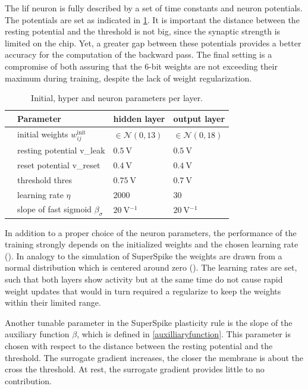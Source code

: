 The \gls{lif} neuron is fully described by a set of time constants and neuron potentials. The potentials are set as indicated in \cref{initparameters}. It is important the distance between the resting potential and the threshold is not big, since the synaptic strength is limited on the chip. Yet, a greater gap between these potentials provides a better accuracy for the computation of the backward pass. The final setting is a compromise of both assuring that the 6-bit weights are not exceeding their maximum during training, despite the lack of weight regularization.

\begin{table}[htb!]\centering{}
	\begin{tabular}{@{}rlll@{}}\toprule
		& Parameter								& 	hidden layer 			& 	output layer \\ \midrule
		& initial weights $w_{ij}^\text{init}$	& 	$\in \mathcal{N}(0,13)$ & 	$\in \mathcal{N}(0,18)$\\
		& resting potential \gls{v_leak}		&	$\SI{0.5}{\V}$ 			& 	$\SI{0.5}{\V}$\\
		& reset potential \gls{v_reset}			&	$\SI{0.4}{\V}$			& 	$\SI{0.4}{\V}$\\
		& threshold \gls{thres} 				&	$\SI{0.75}{\V}$			& 	$\SI{0.7}{\V}$\\
		& learning rate $\eta$ 					&	2000					& 	30			\\
		& slope of fast sigmoid $\beta_\sigma$ 	&	$\SI{20}{\V^{-1}}$		& 	$\SI{20}{\V^{-1}}$	\\
		\bottomrule
	\end{tabular}
	\caption[Initial, hyper and neuron parameters per layer.]{Initial, hyper and neuron parameters per layer.}
	\label{initparameters}
\end{table}

In addition to a proper choice of the neuron parameters, the performance of the training strongly depends on the initialized weights and the chosen learning rate (\citealp{Goodfellow-et-al-2016}). In analogy to the simulation of SuperSpike the weights are drawn from a normal distribution which is centered around zero (\citealp{zenke2018superspike}). The learning rates are set, such that both layers show activity but at the same time do not cause rapid weight updates that would in turn required a regularize to keep the weights within their limited range.

Another tunable parameter in the SuperSpike plasticity rule is the slope of the auxiliary function $\beta$, which is defined in \cref{auxilliaryfunction}. This parameter is chosen with respect to the distance between the resting potential and the threshold. The surrogate gradient increases, the closer the membrane is about the cross the threshold. At rest, the surrogate gradient provides little to no contribution. 

